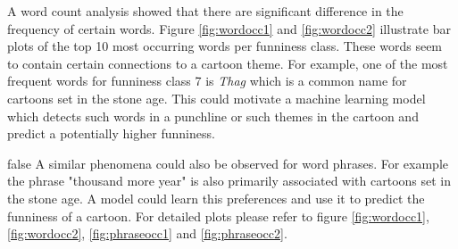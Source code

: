 \documentclass[draft,final,oneside]{vutinfth} %
\begin{document}
A word count analysis showed that there are significant difference in the frequency of certain words. Figure \ref{fig:wordocc1} and \ref{fig:wordocc2} illustrate bar plots of the top 10 most occurring words per funniness class. These words seem to contain certain connections to a cartoon theme. For example, one of the most frequent words for funniness class 7 is \textit{Thag} which is a common name for cartoons set in the stone age. This could motivate a machine learning model which detects such words in a punchline or such themes in the cartoon and predict a potentially higher funniness.

\if false 
A similar phenomena could also be observed for word phrases. For example the phrase "thousand more year" is also primarily associated with cartoons set in the stone age. A model could learn this preferences and use it to predict the funniness of a cartoon. For detailed plots please refer to figure \ref{fig:wordocc1}, \ref{fig:wordocc2}, \ref{fig:phraseocc1} and \ref{fig:phraseocc2}.
\fi
\end{document}

